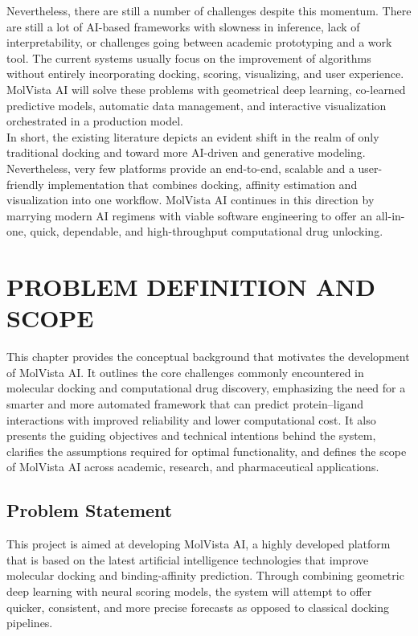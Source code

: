\documentclass[12pt,a4]{report}
\begin{document}
\hspace{0.3in}Nevertheless, there are still a number of challenges despite this momentum. There are still a lot of AI-based frameworks with slowness in inference, lack of interpretability, or challenges going between academic prototyping and a work tool. The current systems usually focus on the improvement of algorithms without entirely incorporating docking, scoring, visualizing, and user experience. MolVista AI will solve these problems with geometrical deep learning, co-learned predictive models, automatic data management, and interactive visualization orchestrated in a production model.\\

\hspace{0.3in}In short, the existing literature depicts an evident shift in the realm of only traditional docking and toward more AI-driven and generative modeling. Nevertheless, very few platforms provide an end-to-end, scalable and a user-friendly implementation that combines docking, affinity estimation and visualization into one workflow. MolVista AI continues in this direction by marrying modern AI regimens with viable software engineering to offer an all-in-one, quick, dependable, and high-throughput computational drug unlocking.

\chapter{PROBLEM DEFINITION \vspace*{0.5\baselineskip} AND SCOPE}

\hspace{0.3in}This chapter provides the conceptual background that motivates the development of MolVista AI. It outlines the core challenges commonly encountered in molecular docking and computational drug discovery, emphasizing the need for a smarter and more automated framework that can predict protein--ligand interactions with improved reliability and lower computational cost. It also presents the guiding objectives and technical intentions behind the system, clarifies the assumptions required for optimal functionality, and defines the scope of MolVista AI across academic, research, and pharmaceutical applications.
\\
\section{Problem Statement}
\hspace*{0.3in}
This project is aimed at developing MolVista AI, a highly developed platform that is based on the latest artificial intelligence technologies that improve molecular docking and binding-affinity prediction. Through combining geometric deep learning with neural scoring models, the system will attempt to offer quicker, consistent, and more precise forecasts as opposed to classical docking pipelines.
\end{document}
